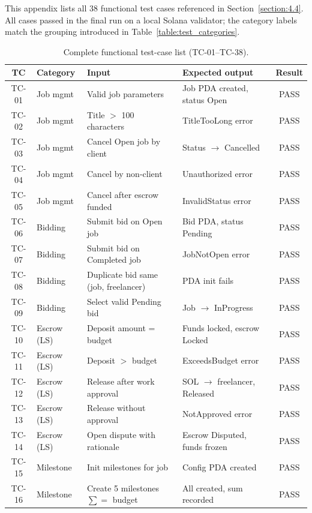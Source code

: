 This appendix lists all 38 functional test cases referenced in Section~\ref{section:4.4}. All cases passed in the final run on a local Solana validator; the category labels match the grouping introduced in Table~\ref{table:test_categories}.

\begin{table}[H]
\centering
\caption{Complete functional test-case list (TC-01--TC-38).}
\label{table:testcases_full}
\small
\begin{tabular}{|c|l|p{4.0cm}|p{4.3cm}|c|}
\hline
\textbf{TC} & \textbf{Category} & \textbf{Input} & \textbf{Expected output} & \textbf{Result} \\ \hline
TC-01 & Job mgmt & Valid job parameters & Job PDA created, status Open & PASS \\ \hline
TC-02 & Job mgmt & Title $>$ 100 characters & TitleTooLong error & PASS \\ \hline
TC-03 & Job mgmt & Cancel Open job by client & Status $\to$ Cancelled & PASS \\ \hline
TC-04 & Job mgmt & Cancel by non-client & Unauthorized error & PASS \\ \hline
TC-05 & Job mgmt & Cancel after escrow funded & InvalidStatus error & PASS \\ \hline
TC-06 & Bidding & Submit bid on Open job & Bid PDA, status Pending & PASS \\ \hline
TC-07 & Bidding & Submit bid on Completed job & JobNotOpen error & PASS \\ \hline
TC-08 & Bidding & Duplicate bid same (job, freelancer) & PDA init fails & PASS \\ \hline
TC-09 & Bidding & Select valid Pending bid & Job $\to$ InProgress & PASS \\ \hline
TC-10 & Escrow (LS) & Deposit amount = budget & Funds locked, escrow Locked & PASS \\ \hline
TC-11 & Escrow (LS) & Deposit $>$ budget & ExceedsBudget error & PASS \\ \hline
TC-12 & Escrow (LS) & Release after work approval & SOL $\to$ freelancer, Released & PASS \\ \hline
TC-13 & Escrow (LS) & Release without approval & NotApproved error & PASS \\ \hline
TC-14 & Escrow (LS) & Open dispute with rationale & Escrow Disputed, funds frozen & PASS \\ \hline
TC-15 & Milestone & Init milestones for job & Config PDA created & PASS \\ \hline
TC-16 & Milestone & Create 5 milestones $\sum = $ budget & All created, sum recorded & PASS \\ \hline

\end{tabular}
\end{table}
